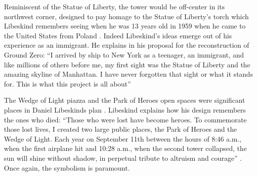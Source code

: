 Reminiscent of the
Statue of Liberty, the tower would be off-center in its northwest
corner, designed to pay homage to the Statue of Liberty’s torch which
Libeskind remembers seeing when he was 13 years old in 1959 when he
came to the United States from Poland \citep{swanson2011}.  Indeed Libeskind’s
ideas emerge out of his experience as an immigrant.  He explains in his
proposal for the reconstruction of Ground Zero: ``I
arrived by ship to New York as a teenager, an immigrant, and like
millions of others before me, my first sight was the Statue of Liberty
and the amazing skyline of Manhattan.  I have never forgotten that
sight or what it stands for.  This is what this project is all about'' \cite{libeskind2012}

The Wedge of Light piazza and the Park of Heroes open spaces were
significant places in Daniel Libeskind{\textquotesingle}s plan
\citep{manhattan2003}.  Libeskind explains how his design
remembers the ones who died: “Those who were lost
have become heroes.  To commemorate those lost lives, I created two
large public places, the Park of Heroes and the Wedge of Light.  Each
year on September 11th between the hours of 8:46 a.m., when the first
airplane hit and 10:28 a.m., when the second tower collapsed, the sun
will shine without shadow, in perpetual tribute to altruism and
courage” \citep{libeskind2012}.  Once again, the symbolism
is paramount.  


